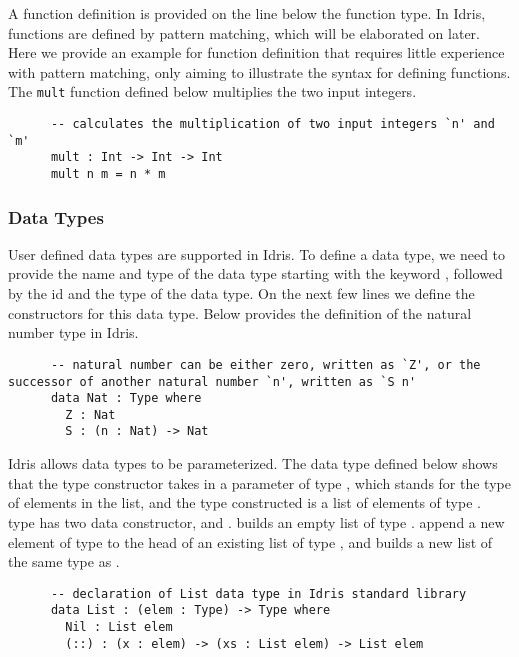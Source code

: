 A function definition is provided on the line below the function type. In Idris, functions are defined by pattern matching, which will be elaborated on later. Here we provide an example for function definition that requires little experience with pattern matching, only aiming to illustrate the syntax for defining functions. The \texttt{mult} function defined below multiplies the two input integers. 
\begin{lstlisting}
      -- calculates the multiplication of two input integers `n' and `m'
      mult : Int -> Int -> Int
      mult n m = n * m
\end{lstlisting}

\subsubsection*{Data Types}
User defined data types are supported in Idris. To define a data type, we need to provide the name and type of the data type starting with the keyword , followed by the id and the type of the data type. On the next few lines we define the constructors for this data type. Below provides the definition of the natural number type  in Idris. 
\begin{lstlisting}
      -- natural number can be either zero, written as `Z', or the successor of another natural number `n', written as `S n'
      data Nat : Type where
        Z : Nat
        S : (n : Nat) -> Nat 
\end{lstlisting}

Idris allows data types to be parameterized. The data type defined below shows that the type constructor  takes in a parameter  of type , which stands for the type of elements in the list, and the type constructed is a list of elements of type .  type has two data constructor,  and \inl{(::)}.  builds an empty list of type . \inl{(::)} append a new element  of type  to the head of an existing list  of type , and builds a new list  of the same type as . 
 \begin{lstlisting}
      -- declaration of List data type in Idris standard library
      data List : (elem : Type) -> Type where
        Nil : List elem
        (::) : (x : elem) -> (xs : List elem) -> List elem
\end{lstlisting}


